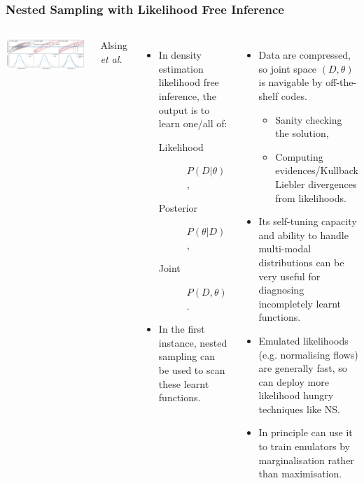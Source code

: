 \documentclass[aspectratio=169]{beamer}
\begin{document}
\begin{frame}
    \frametitle{Nested Sampling with Likelihood Free Inference}
    \begin{columns}
        \includegraphics[width=\textwidth]{figures/three_ways_II.pdf}

        \hfill Alsing \textit{et al.}~
    \begin{itemize}
        \item In density estimation likelihood free inference, the output is to learn one/all of:
            \begin{description}
                \item[Likelihood] $P(D|\theta)$,
                \item[Posterior] $P(\theta|D)$,
                \item[Joint] $P(D,\theta)$.
            \end{description}
        \item In the first instance, nested sampling can be used to scan these learnt functions.
    \end{itemize}
    \begin{itemize}
        \item Data are compressed, so joint space $(D,\theta)$ is navigable by off-the-shelf codes. 
            \begin{itemize}
                \item Sanity checking the solution,
                \item Computing evidences/Kullback Liebler divergences from likelihoods.
            \end{itemize}
        \item Its self-tuning capacity and ability to handle multi-modal distributions can be very useful for diagnosing incompletely learnt functions.
        \item Emulated likelihoods (e.g. normalising flows) are generally fast, so can deploy more likelihood hungry techniques like NS.
        \item In principle can use it to train emulators by marginalisation rather than maximisation.
    \end{itemize}
    \end{columns}
\end{frame}
\end{document}
